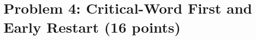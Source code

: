 \documentclass[11pt]{article}
\begin{document}
\section{Problem 4: Critical-Word First and Early Restart (16 points)}
\end{document}
